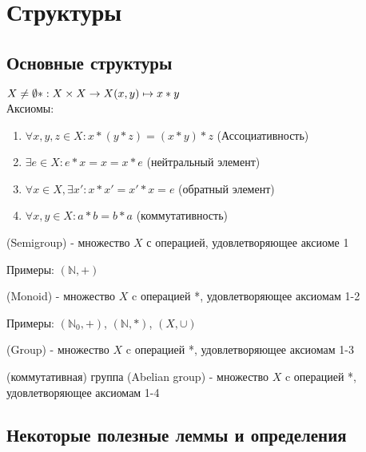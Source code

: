 \documentclass[a4paper, 14pt]{article}
\begin{document}
    \section{Структуры}
    \subsection{Основные структуры}
    $X \neq \emptyset \\
    *: X \times X \rightarrow X \\
    (x,y) \mapsto x * y$ \\

    Аксиомы:
    \begin{enumerate}
        \item $\forall x,y,z \in X: x * (y * z) = (x * y) * z$ (Ассоциативность)
        \item $\exists e \in X: e * x = x = x * e$ (нейтральный элемент)
        \item $\forall x \in X, \exists x': x * x' = x' * x = e$ (обратный элемент)
        \item $\forall x,y \in X: a * b = b * a$ (коммутативность)
    \end{enumerate}
    
    \begin{definition}
        { (Semigroup)} - множество $X$ с операцией, удовлетворяющее аксиоме 1
    \end{definition}
    Примеры: $(\mathbb{N}, +)$
    \begin{definition}
        { (Monoid)} - множество $X$ c операцией *, удовлетворяющее аксиомам 1-2
    \end{definition}
    Примеры: $(\mathbb{N}_0, +)$, $(\mathbb{N}, *)$, $(X, \cup)$
    
    \begin{definition}
        { (Group)} - множество $X$ c операцией *, удовлетворяющее аксиомам 1-3
    \end{definition}

    \begin{definition}
        { (коммутативная) группа (Abelian group)} - множество $X$ c операцией *, удовлетворяющее аксиомам 1-4
    \end{definition}

    \subsection{Некоторые полезные леммы и определения}
\end{document}
